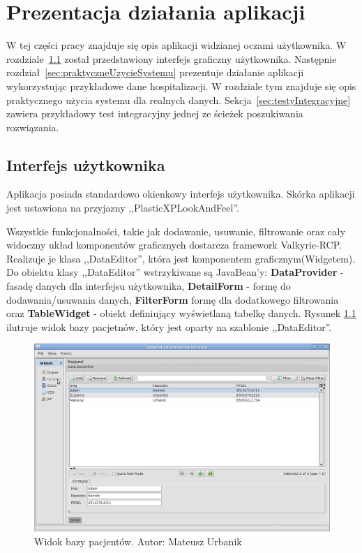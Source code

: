 \chapter{Prezentacja działania aplikacji}
\label{cha:prezentacja}

W tej części pracy znajduje się opis aplikacji widzianej oczami użytkownika. W rozdziale~\ref{sec:interfejsUzytkownika} został
przedstawiony interfejs graficzny użytkownika. Następnie rozdział~\ref{sec:praktyczneUzycieSystemu} prezentuje działanie aplikacji wykorzystując przykładowe dane hospitalizacji. W rozdziale tym znajduje się opis praktycznego użycia systemu dla realnych danych. Sekcja~\ref{sec:testyIntegracyjne} zawiera przykładowy test integracyjny jednej ze ścieżek poszukiwania rozwiązania.


\section{Interfejs użytkownika}
\label{sec:interfejsUzytkownika}
Aplikacja posiada standardowo okienkowy interfejs użytkownika. Skórka aplikacji jest ustawiona na przyjazny ,,PlasticXPLookAndFeel''.

Wszystkie funkcjonalności, takie jak dodawanie, usuwanie, filtrowanie oraz cały widoczny układ komponentów graficznych dostarcza framework Valkyrie-RCP. Realizuje je klasa ,,DataEditor'', która jest komponentem graficznym(Widgetem). Do obiektu klasy ,,DataEditor'' wstrzykiwane są JavaBean'y: \textbf{DataProvider} - fasadę danych dla interfejsu użytkownika, \textbf{DetailForm} - formę do dodawania/usuwania danych, \textbf{FilterForm} formę dla dodatkowego filtrowania oraz \textbf{TableWidget} - obiekt definiujący wyświetlaną tabelkę danych\cite{valkyrie_reference}.
Rysunek \ref{img:patient} ilutruje widok bazy pacjetnów, który jest oparty na szablonie ,,DataEditor''.

\begin{figure}[!ht]
\centering
\includegraphics[scale=0.4]{images/patient} 
\caption[Widok bazy pacjentów]{Widok bazy pacjentów. Autor: Mateusz Urbanik}
\label{img:patient}
\end{figure}

